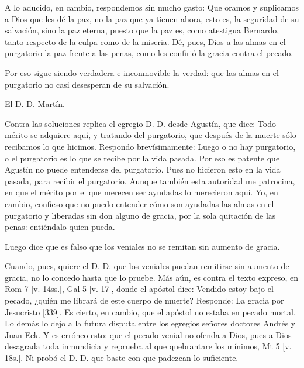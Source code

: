 A lo aducido, en cambio, respondemos sin mucho gasto: Que oramos y suplicamos a Dios que les dé la paz, no la paz que ya tienen ahora, esto es, la seguridad de su salvación, sino la paz eterna, puesto que la paz es, como atestigua Bernardo, tanto respecto de la culpa como de la miseria. Dé, pues, Dios a las almas en el purgatorio la paz frente a las penas, como les confirió la gracia contra el pecado.

Por eso sigue siendo verdadera e inconmovible la verdad: que las almas en el purgatorio no casi desesperan de su salvación.

El D. D. Martín.

Contra las soluciones replica el egregio D. D. desde Agustín, que dice: Todo mérito se adquiere aquí, y tratando del purgatorio, que después de la muerte sólo recibamos lo que hicimos. Respondo brevísimamente: Luego o no hay purgatorio, o el purgatorio es lo que se recibe por la vida pasada. Por eso es patente que Agustín no puede entenderse del purgatorio. Pues no hicieron esto en la vida pasada, para recibir el purgatorio. Aunque también esta autoridad me patrocina, en que el mérito por el que merecen ser ayudadas lo merecieron aquí. Yo, en cambio, confieso que no puedo entender cómo son ayudadas las almas en el purgatorio y liberadas sin don alguno de gracia, por la sola quitación de las penas: entiéndalo quien pueda.

Luego dice que es falso que los veniales no se remitan sin aumento de gracia.

Cuando, pues, quiere el D. D. que los veniales puedan remitirse sin aumento de gracia, no lo concedo hasta que lo pruebe. Más aún, es contra el texto expreso, en Rom 7 [v. 14ss.], Gal 5 [v. 17], donde el apóstol dice: Vendido estoy bajo el pecado, ¿quién me librará de este cuerpo de muerte? Responde: La gracia por Jesucristo [339]. Es cierto, en cambio, que el apóstol no estaba en pecado mortal. Lo demás lo dejo a la futura disputa entre los egregios señores doctores Andrés y Juan Eck. Y es erróneo esto: que el pecado venial no ofenda a Dios, pues a Dios desagrada toda inmundicia y reprueba al que quebrantare los mínimos, Mt 5 [v. 18s.]. Ni probó el D. D. que baste con que padezcan lo suficiente.

